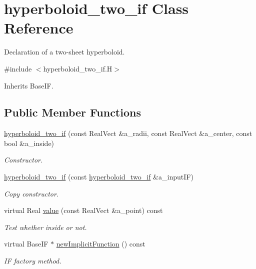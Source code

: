 \hypertarget{classhyperboloid__two__if}{}\section{hyperboloid\+\_\+two\+\_\+if Class Reference}
\label{classhyperboloid__two__if}


Declaration of a two-\/sheet hyperboloid.  




{\ttfamily \#include $<$hyperboloid\+\_\+two\+\_\+if.\+H$>$}



Inherits Base\+IF.

\subsection*{Public Member Functions}
\begin{DoxyCompactItemize}
\item 
\hyperlink{classhyperboloid__two__if_a8e2d79194d6b41f8a174af8f16a5e951}{hyperboloid\+\_\+two\+\_\+if} (const Real\+Vect \&a\+\_\+radii, const Real\+Vect \&a\+\_\+center, const bool \&a\+\_\+inside)
\begin{DoxyCompactList}\small\item\em Constructor. \end{DoxyCompactList}\item 
\hyperlink{classhyperboloid__two__if_aa86d7b9e667a48d3f78fac2f62e7b90d}{hyperboloid\+\_\+two\+\_\+if} (const \hyperlink{classhyperboloid__two__if}{hyperboloid\+\_\+two\+\_\+if} \&a\+\_\+input\+IF)
\begin{DoxyCompactList}\small\item\em Copy constructor. \end{DoxyCompactList}\item 
virtual Real \hyperlink{classhyperboloid__two__if_a5115050d0491a5e01d1ed1a1da1311b4}{value} (const Real\+Vect \&a\+\_\+point) const 
\begin{DoxyCompactList}\small\item\em Test whether inside or not. \end{DoxyCompactList}\item 
virtual Base\+IF $\ast$ \hyperlink{classhyperboloid__two__if_ad52441050e46cb093559b610701b666c}{new\+Implicit\+Function} () const 
\begin{DoxyCompactList}\small\item\em IF factory method. \end{DoxyCompactList}\end{DoxyCompactItemize}
